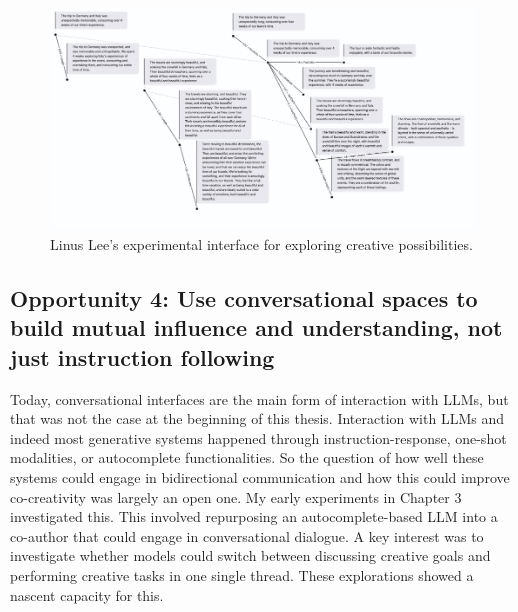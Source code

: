 \begin{figure}[H]
    \centering
    \includegraphics[width=0.8\linewidth]{linus.png}
    \caption{Linus Lee's experimental interface for exploring creative possibilities.}
    \label{fig:linus}
\end{figure}


\subsection{Opportunity 4: Use conversational spaces to build mutual influence and understanding, not just instruction following}

Today, conversational interfaces are the main form of interaction with LLMs, but that was not the case at the beginning of this thesis. Interaction with LLMs and indeed most generative systems happened through instruction-response, one-shot modalities, or autocomplete functionalities. So the question of how well these systems could engage in bidirectional communication and how this could improve co-creativity was largely an open one. My early experiments in Chapter 3 investigated this. This involved repurposing an autocomplete-based LLM into a co-author that could engage in conversational dialogue. A key interest was to investigate whether models could switch between discussing creative goals and performing creative tasks in one single thread. These explorations showed a nascent capacity for this.

